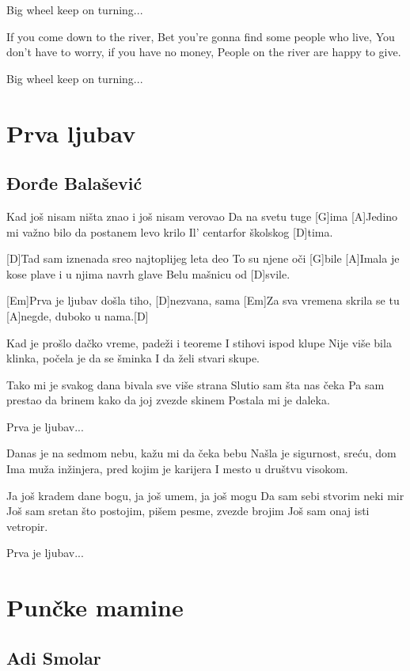 \documentclass[a4paper,12pt]{article}
\begin{document}
\begin{multicols}{2}
\begin{guitar}
Big wheel keep on turning...


If you come down to the river, 
Bet you're gonna find some people who live, 
You don't have to worry, if you have no money, 
People on the river are happy to give. 


Big wheel keep on turning...

\end{guitar}
\section{Prva ljubav}
\subsection*{Đorđe Balašević}
\begin{guitar}
[D]Kad još nisam ništa znao i još nisam verovao
Da na svetu tuge [G]ima
[A]Jedino mi važno bilo da postanem levo krilo
Il' centarfor školskog [D]tima.


[D]Tad sam iznenada sreo najtoplijeg leta deo
To su njene oči [G]bile
[A]Imala je kose plave i u njima navrh glave
Belu mašnicu od [D]svile.


[Em]Prva je ljubav došla tiho, [D]nezvana, sama
[Em]Za sva vremena skrila se tu [A]negde, 
duboko u nama.[D]


Kad je prošlo dačko vreme, padeži i teoreme
I stihovi ispod klupe
Nije više bila klinka, počela je da se šminka
I da želi stvari skupe.


Tako mi je svakog dana bivala sve više strana
Slutio sam šta nas čeka
Pa sam prestao da brinem 
kako da joj zvezde skinem
Postala mi je daleka.

Prva je ljubav...

Danas je na sedmom nebu, 
kažu mi da čeka bebu
Našla je sigurnost, sreću, dom
Ima muža inžinjera, pred kojim je karijera
I mesto u društvu visokom.

Ja još kradem dane bogu, 
ja još umem, ja još mogu
Da sam sebi stvorim neki mir
Još sam sretan što postojim, 
pišem pesme, zvezde brojim
Još sam onaj isti vetropir.

Prva je ljubav...

\end{guitar}
\section{Punčke mamine}
\subsection*{Adi Smolar}
\begin{guitar}


\end{guitar}
\end{multicols}
\end{document}
